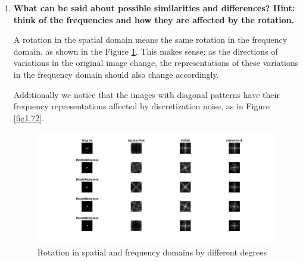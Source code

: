 \documentclass{article}
\begin{document}
\begin{enumerate}
As shown in Figure \ref{fig1.6}, in the second pattern, the square in the spatial domain is represented by the same frequency pattern in both x and y direction in Fourier domain. Compared to pattern 2, pattern 1 compresses along y-axis and expands along x-axis. As a result, the pattern in Fourier domain expands along y-axis and compresses along x-axis. 
We can conclude that the compression in one domain is an expansion in another, and vice versa. 

\item \textbf{What can be said about possible similarities and differences? Hint: think of the frequencies and how they are affected by the rotation.}

A rotation in the spatial domain means the same rotation in the frequency domain, as shown in the Figure \ref{fig1.7}. This makes sense: as the directions of variations in the original image change, the representations of these variations in the frequency domain should also change accordingly.

Additionally we notice that the images with diagonal patterns have their frequency representations affected by discretization noise, as in Figure \ref{fig1.72}.

\begin{figure}[H]
        \centering
        \hspace{-1cm}
 \includegraphics[width=18cm]{17.jpg}
        \caption{Rotation in spatial and frequency domains by different degrees}
        \label{fig1.7}
\end{figure}


\end{enumerate}
\end{document}

